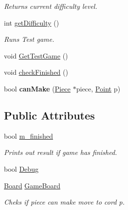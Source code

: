 \begin{DoxyCompactItemize}
\begin{DoxyCompactList}\small\item\em Returns current difficulty level. \end{DoxyCompactList}\item 
\hypertarget{class_game_a2c0efe888e453a7fc0e644503fbd6316}{int \hyperlink{class_game_a2c0efe888e453a7fc0e644503fbd6316}{get\-Difficulty} ()}\label{class_game_a2c0efe888e453a7fc0e644503fbd6316}

\begin{DoxyCompactList}\small\item\em Runs Test game. \end{DoxyCompactList}\item 
void \hyperlink{class_game_a1f47238d93728540edb7940a80a9db89}{Get\-Test\-Game} ()
\item 
void \hyperlink{class_game_ae5be70ea28f2ec151cd93e86086f23a9}{check\-Finished} ()
\item 
\hypertarget{class_game_a37edad1c1ded84b1735653f809ccb585}{bool {\bfseries can\-Make} (\hyperlink{class_piece}{Piece} $\ast$piece, \hyperlink{struct_point}{Point} p)}\label{class_game_a37edad1c1ded84b1735653f809ccb585}

\end{DoxyCompactItemize}
\subsection*{Public Attributes}
\begin{DoxyCompactItemize}
\item 
\hypertarget{class_game_aee0b70deb19422d35b2061beb339bdf8}{bool \hyperlink{class_game_aee0b70deb19422d35b2061beb339bdf8}{m\-\_\-finished}}\label{class_game_aee0b70deb19422d35b2061beb339bdf8}

\begin{DoxyCompactList}\small\item\em Prints out result if game has finished. \end{DoxyCompactList}\item 
bool \hyperlink{class_game_ad79740c2d2fa299cf322bf6ea322d9aa}{Debug}
\item 
\hypertarget{class_game_aeb67bc4fc06221330cfd7c862c85b66d}{\hyperlink{class_board}{Board} \hyperlink{class_game_aeb67bc4fc06221330cfd7c862c85b66d}{Game\-Board}}\label{class_game_aeb67bc4fc06221330cfd7c862c85b66d}

\begin{DoxyCompactList}\small\item\em Cheks if piece can make move to cord p. \end{DoxyCompactList}\end{DoxyCompactItemize}
